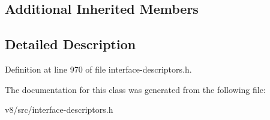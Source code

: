 \subsection*{Additional Inherited Members}


\subsection{Detailed Description}


Definition at line 970 of file interface-\/descriptors.\+h.



The documentation for this class was generated from the following file\+:\begin{DoxyCompactItemize}
\item 
v8/src/interface-\/descriptors.\+h\end{DoxyCompactItemize}

